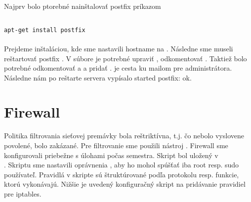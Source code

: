 \paragraph{}
Najprv bolo ptorebné nainštalovať postfix príkazom

\noindent
{\selectfont
\begin{small}
\begin{verbatim}

apt-get install postfix

\end{verbatim}
\end{small}
}

\paragraph{}
Prejdeme inštaláciou, kde sme nastavili hostname na . Následne sme museli reštartovať postfix . V súbore  je potrebné upraviť , odkomentovať . Taktiež bolo potrebné odkomentovať  a  a pridať .  je cesta ku mailom pre administrátora. Následne nám po reštarte servera vypísalo started postfix: ok.









\section{Firewall}
\paragraph{}
Politika filtrovania sieťovej premávky bola reštriktívna, t.j. čo nebolo vyslovene povolené, bolo zakázané. Pre filtrovanie sme použili nástroj . Firewall sme konfigurovali priebežne s úlohami počas semestra. Skript bol uložený v\\ . Skriptu sme nastavili oprávnenia , aby ho mohol spúšťať iba root resp. sudo používateľ. Pravidlá v skripte sú štruktúro\-vané podľa protokolu resp. funkcie, ktorú vykonávajú. Nižšie je uvedený konfiguračný skript na pridávanie pravidiel pre iptables.

